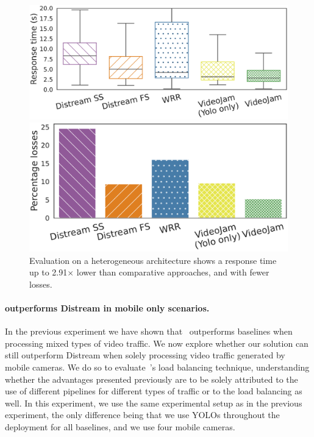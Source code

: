\begin{figure}
	\begin{minipage}[t]{.52\linewidth}
		\centering
		\includegraphics[width=\linewidth]{chapters/videojam/images/distream_vs_videojam/heterogeneous/response_time.pdf}
	\end{minipage}
	\hfill
	\begin{minipage}[t]{.46\linewidth}
		\centering
		\includegraphics[width=\linewidth]{chapters/videojam/images/distream_vs_videojam/heterogeneous/percentage_losses.pdf}
	\end{minipage}
	\caption{Evaluation on a heterogeneous architecture shows a response time up to 2.91$\times$ lower than comparative approaches, and with fewer losses.}
	\label{fig:distream_vs_videojam_heterogeneous}
	\vspace{-3mm}
\end{figure}

\paragraph{\videojam{} outperforms Distream in mobile only scenarios.} In the previous experiment we have shown that~\videojam{} outperforms baselines when processing mixed types of video traffic. We now explore whether our solution can still outperform Distream when solely processing video traffic generated by mobile cameras. We do so to evaluate~\videojam{}'s load balancing technique, understanding whether the advantages presented previously are to be solely attributed to the use of different pipelines for different types of traffic or to the load balancing as well. In this experiment, we use the same experimental setup as in the previous experiment, the only difference being that we use YOLOs throughout the deployment for all baselines, and we use four mobile cameras.

